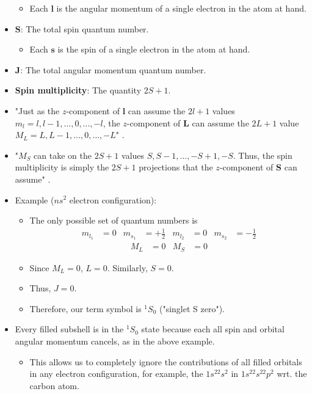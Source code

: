 \documentclass[../notes.tex]{subfiles}
\begin{document}
\begin{itemize}
    \begin{itemize}
        \item Each $\mathbf{l}$ is the angular momentum of a single electron in the atom at hand.
    \end{itemize}
    \item $\bm{S}$: The total spin quantum number.
    \begin{itemize}
        \item Each $\mathbf{s}$ is the spin of a single electron in the atom at hand.
    \end{itemize}
    \item $\bm{J}$: The total angular momentum quantum number.
    \item \textbf{Spin multiplicity}: The quantity $2S+1$.
    \item "Just as the $z$-component of $\mathbf{l}$ can assume the $2l+1$ values $m_l=l,l-1,\dots,0,\dots,-l$, the $z$-component of $\mathbf{L}$ can assume the $2L+1$ value $M_L=L,L-1,\dots,0,\dots,-L$" \parencite[293]{bib:McQuarrieSimon}.
    \item "$M_S$ can take on the $2S+1$ values $S,S-1,\dots,-S+1,-S$. Thus, the spin multiplicity is simply the $2S+1$ projections that the $z$-component of $\mathbf{S}$ can assume" \parencite[294]{bib:McQuarrieSimon}.
    \item Example ($ns^2$ electron configuration):
    \begin{itemize}
        \item The only possible set of quantum numbers is
        \begin{align*}
            m_{l_1} &= 0&
            m_{s_1} &= +\frac{1}{2}&
            m_{l_2} &= 0&
            m_{s_2} &= -\frac{1}{2}
        \end{align*}
        \begin{align*}
            M_L &= 0&
            M_S &= 0
        \end{align*}
        \item Since $M_L=0$, $L=0$. Similarly, $S=0$.
        \item Thus, $J=0$.
        \item Therefore, our term symbol is ${}^1S_0$ ("singlet S zero").
    \end{itemize}
    \item Every filled subshell is in the ${}^1S_0$ state because each all spin and orbital angular momentum cancels, as in the above example.
    \begin{itemize}
        \item This allows us to completely ignore the contributions of all filled orbitals in any electron configuration, for example, the $1s^22s^2$ in $1s^22s^22p^2$ wrt. the carbon atom.

\end{itemize}
\end{itemize}
\end{document}
